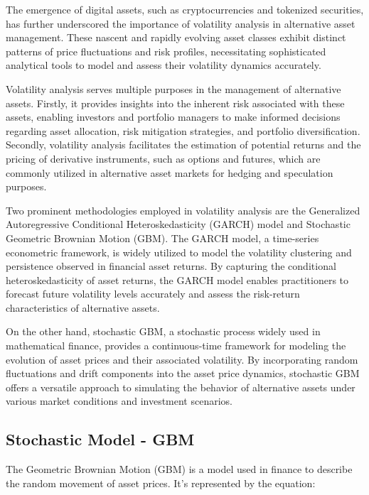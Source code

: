 \documentclass{ledger}
\begin{document}
The emergence of digital assets, such as cryptocurrencies and tokenized securities, has further underscored the importance of volatility analysis in alternative asset management. These nascent and rapidly evolving asset classes exhibit distinct patterns of price fluctuations and risk profiles, necessitating sophisticated analytical tools to model and assess their volatility dynamics accurately.

Volatility analysis serves multiple purposes in the management of alternative assets. Firstly, it provides insights into the inherent risk associated with these assets, enabling investors and portfolio managers to make informed decisions regarding asset allocation, risk mitigation strategies, and portfolio diversification. Secondly, volatility analysis facilitates the estimation of potential returns and the pricing of derivative instruments, such as options and futures, which are commonly utilized in alternative asset markets for hedging and speculation purposes.

Two prominent methodologies employed in volatility analysis are the Generalized Autoregressive Conditional Heteroskedasticity (GARCH) model and Stochastic Geometric Brownian Motion (GBM). The GARCH model, a time-series econometric framework, is widely utilized to model the volatility clustering and persistence observed in financial asset returns. By capturing the conditional heteroskedasticity of asset returns, the GARCH model enables practitioners to forecast future volatility levels accurately and assess the risk-return characteristics of alternative assets.

On the other hand, stochastic GBM, a stochastic process widely used in mathematical finance, provides a continuous-time framework for modeling the evolution of asset prices and their associated volatility. By incorporating random fluctuations and drift components into the asset price dynamics, stochastic GBM offers a versatile approach to simulating the behavior of alternative assets under various market conditions and investment scenarios.

\subsection{Stochastic Model - GBM}

\hfill \break

The Geometric Brownian Motion (GBM) is a model used in finance to describe the random movement of asset prices. It's represented by the equation:
\end{document}

